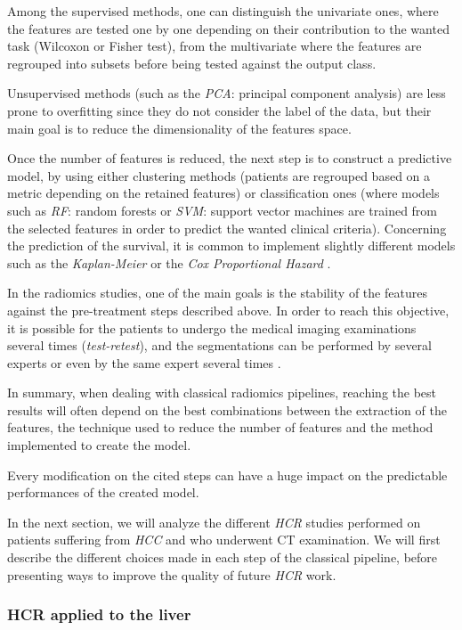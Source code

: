 \documentclass[]{article}
\begin{document}
Among the supervised methods, one can distinguish the univariate ones,
where the features are tested one by one depending on their contribution
to the wanted task (Wilcoxon or Fisher test), from the multivariate
where the features are regrouped into subsets before being tested
against the output class.

Unsupervised methods (such as the \emph{PCA}: principal component
analysis) are less prone to overfitting since they do not consider the
label of the data, but their main goal is to reduce the dimensionality
of the features space.

Once the number of features is reduced, the next step is to construct a
predictive model, by using either clustering methods (patients are
regrouped based on a metric depending on the retained features) or
classification ones (where models such as \emph{RF}: random forests or
\emph{SVM}: support vector machines are trained from the selected
features in order to predict the wanted clinical criteria). Concerning
the prediction of the survival, it is common to implement slightly
different models such as the \emph{Kaplan-Meier} or the \emph{Cox
Proportional Hazard} \cite{Oikonomou2018}.

In the radiomics studies, one of the main goals is the stability of the
features against the pre-treatment steps described above. In order to
reach this objective, it is possible for the patients to undergo the
medical imaging examinations several times (\emph{test-retest}), and the
segmentations can be performed by several experts or even by the same
expert several times \cite{Griethuysen2017}.

In summary, when dealing with classical radiomics pipelines, reaching
the best results will often depend on the best combinations between the
extraction of the features, the technique used to reduce the number of
features and the method implemented to create the model.

Every modification on the cited steps can have a huge impact on the
predictable performances of the created model.

In the next section, we will analyze the different \emph{HCR} studies
performed on patients suffering from \emph{HCC} and who underwent CT
examination. We will first describe the different choices made in each
step of the classical pipeline, before presenting ways to improve the
quality of future \emph{HCR} work.

\subsubsection{HCR applied to the liver}\label{hcr-applied-to-the-liver}
\end{document}

